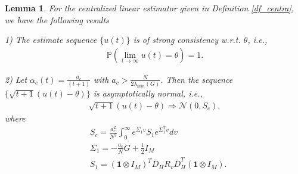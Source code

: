 \documentclass[10pt,journal,final]{IEEEtran}
\theoremstyle{plain}
\newtheorem{lemma}{\textbf{Lemma}}[section]
\theoremstyle{definition}
\theoremstyle{remark}
\begin{document}
\begin{lemma}\label{prop_centr}\cite{kar2011convergence}
	For the centralized linear estimator given in Definition \ref{df_centra}, we have the following results
	
	1) The estimate sequence $\{u(t)\}$ is of strong consistency w.r.t. $\theta$, i.e., 
	\begin{align}
	\mathbb{P}\left(\lim\limits_{t\rightarrow\infty}u(t)=\theta\right)=1.
	\end{align}
	
	2) Let $\alpha_c(t)=\frac{a_c}{(t+1)}$ with $a_c>\frac{N}{2\lambda_{min}(G)}$.
	Then the sequence $\{\sqrt{t+1}(u(t)-\theta)\}$ is asymptotically normal, i.e.,
	\begin{align*}
	\sqrt{t+1}(u(t)-\theta)\Rightarrow \mathcal{N}(0,S_c),
	\end{align*}
	where 
	\begin{align*}
	&S_c =\frac{a_c^2}{N^2}\int_{0}^{\infty}e^{\varSigma_1v}S_1e^{\varSigma_1^Tv}dv\\
	&\varSigma_1=-\frac{a_c}{N}G+\frac{1}{2}I_M\\
	&S_1=(\textbf{1}\otimes I_M)^T\bar D_{ H}R_v\bar D_{ H}^T(\textbf{1}\otimes I_M).
	\end{align*}
	
\end{lemma}
\end{document}
